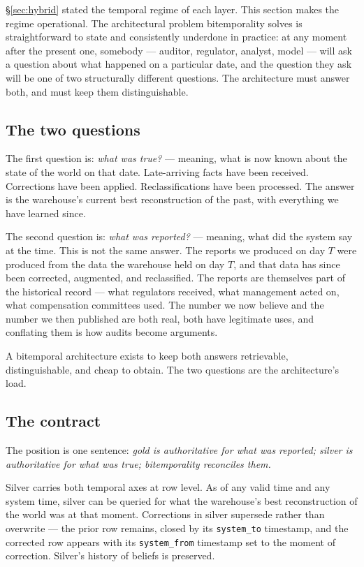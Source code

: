 \documentclass[11pt,a4paper]{article}
\begin{document}
\S\ref{sec:hybrid} stated the temporal regime of each layer. This section makes the regime operational. The architectural problem bitemporality solves is straightforward to state and consistently underdone in practice: at any moment after the present one, somebody --- auditor, regulator, analyst, model --- will ask a question about what happened on a particular date, and the question they ask will be one of two structurally different questions. The architecture must answer both, and must keep them distinguishable.

\subsection{The two questions}

The first question is: \emph{what was true?} --- meaning, what is now known about the state of the world on that date. Late-arriving facts have been received. Corrections have been applied. Reclassifications have been processed. The answer is the warehouse's current best reconstruction of the past, with everything we have learned since.

The second question is: \emph{what was reported?} --- meaning, what did the system say at the time. This is not the same answer. The reports we produced on day $T$ were produced from the data the warehouse held on day $T$, and that data has since been corrected, augmented, and reclassified. The reports are themselves part of the historical record --- what regulators received, what management acted on, what compensation committees used. The number we now believe and the number we then published are both real, both have legitimate uses, and conflating them is how audits become arguments.

A bitemporal architecture exists to keep both answers retrievable, distinguishable, and cheap to obtain. The two questions are the architecture's load.

\subsection{The contract}

The position is one sentence: \emph{gold is authoritative for what was reported; silver is authoritative for what was true; bitemporality reconciles them.}

Silver carries both temporal axes at row level. As of any valid time and any system time, silver can be queried for what the warehouse's best reconstruction of the world was at that moment. Corrections in silver supersede rather than overwrite --- the prior row remains, closed by its \texttt{system\_to} timestamp, and the corrected row appears with its \texttt{system\_from} timestamp set to the moment of correction. Silver's history of beliefs is preserved.
\end{document}
